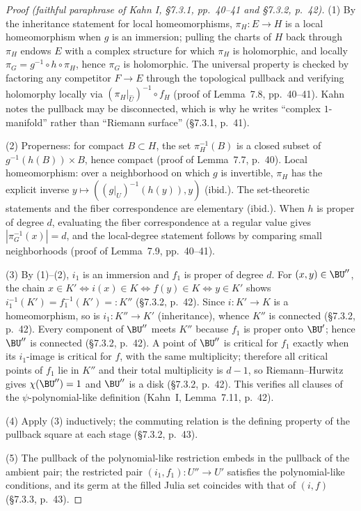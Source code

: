 \begin{proof}[Proof (faithful paraphrase of Kahn I, \S7.3.1, pp.~40--41 and \S7.3.2, p.~42)]
(1) By the inheritance statement for local homeomorphisms,
\(\pi_H\colon E\to H\) is a local homeomorphism when \(g\) is an
immersion; pulling the charts of \(H\) back through \(\pi_H\) endows
\(E\) with a complex structure for which \(\pi_H\) is holomorphic, and
locally \(\pi_G=g^{-1}\circ h\circ\pi_H\), hence \(\pi_G\) is
holomorphic.  The universal property is checked by factoring any
competitor \(F\to E\) through the topological pullback and verifying
holomorphy locally via \((\pi_H|_{\widehat U})^{-1}\circ f_H\)
(proof of Lemma~7.8, pp.~40--41).  Kahn notes the pullback may be disconnected, which is
why he writes ``complex \(1\)-manifold'' rather than ``Riemann
surface'' (\S7.3.1, p.~41).

(2) Properness: for compact \(B\subset H\), the set \(\pi_H^{-1}(B)\)
is a closed subset of \(g^{-1}(h(B))\times B\), hence compact
(proof of Lemma~7.7, p.~40).  Local homeomorphism: over a neighborhood on which
\(g\) is invertible, \(\pi_H\) has the explicit inverse
\(y\mapsto((g|_U)^{-1}(h(y)),y)\) (ibid.).  The set-theoretic
statements and the fiber correspondence are elementary
(ibid.).  When \(h\) is proper of degree \(d\), evaluating the
fiber correspondence at a regular value gives
\(|\pi_G^{-1}(x)|=d\), and the local-degree statement follows by
comparing small neighborhoods (proof of Lemma~7.9, pp.~40--41).

(3) By (1)--(2), \(i_1\) is an immersion and \(f_1\) is proper of
degree \(d\).  For \((x,y)\in\BU''\), the chain
\(x\in K'\iff i(x)\in K\iff f(y)\in K\iff y\in K'\) shows
\(i_1^{-1}(K')=f_1^{-1}(K')=:K''\) (\S7.3.2, p.~42).  Since
\(i\colon K'\to K\) is a homeomorphism, so is
\(i_1\colon K''\to K'\) (inheritance), whence \(K''\) is connected
(\S7.3.2, p.~42).  Every component of \(\BU''\) meets \(K''\) because
\(f_1\) is proper onto \(\BU'\); hence \(\BU''\) is connected
(\S7.3.2, p.~42).  A point of \(\BU''\) is critical for \(f_1\) exactly
when its \(i_1\)-image is critical for \(f\), with the same
multiplicity; therefore all critical points of \(f_1\) lie in \(K''\)
and their total multiplicity is \(d-1\), so Riemann--Hurwitz gives
\(\chi(\BU'')=1\) and \(\BU''\) is a disk (\S7.3.2, p.~42).  This
verifies all clauses of the \(\psi\)-polynomial-like definition
(Kahn~I, Lemma~7.11, p.~42).

(4) Apply (3) inductively; the commuting relation is the defining
property of the pullback square at each stage (\S7.3.2, p.~43).

(5) The pullback of the polynomial-like restriction embeds in the
pullback of the ambient pair; the restricted pair
\((i_1,f_1)\colon U''\to U'\) satisfies the polynomial-like
conditions, and its germ at the filled Julia set coincides with that
of \((i,f)\) (\S7.3.3, p.~43).
\end{proof}
